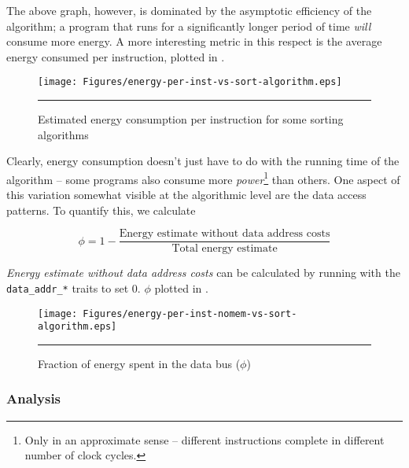 The above graph, however, is dominated by the asymptotic efficiency of
the algorithm; a program that runs for a significantly longer period
of time \textit{will} consume more energy.  A more interesting metric
in this respect is the average energy consumed per instruction,
plotted in .

\begin{figure}[htbp]
  \centering
  \texttt{[image: Figures/energy-per-inst-vs-sort-algorithm.eps]}
  \rule{35em}{0.5pt}
  \caption{Estimated energy consumption per instruction for some sorting algorithms}
  \label{fig:energy-per-inst-sort-algo}
\end{figure}

Clearly, energy consumption doesn't just have to do with the running
time of the algorithm -- some programs also consume more
\textit{power}\footnote{Only in an approximate sense -- different
  instructions complete in different number of clock cycles.} than
others.  One aspect of this variation somewhat visible at the
algorithmic level are the data access patterns.  To quantify this, we
calculate

\begin{equation}
\phi = 1 - \frac{\text{Energy estimate without data address
    costs}}{\text{Total energy estimate}}
\end{equation}

\textit{Energy estimate without data address costs} can be calculated
by running \wattage with the \texttt{data\_addr\_*} traits to set 0.
$\phi$ plotted in .

\begin{figure}[htbp]
  \centering
  \texttt{[image: Figures/energy-per-inst-nomem-vs-sort-algorithm.eps]}
  \rule{35em}{0.5pt}
  \caption{Fraction of energy spent in the data bus ($\phi$)}
  \label{fig:energy-per-inst-nomem-sort-algo}
\end{figure}

\subsubsection{Analysis}

